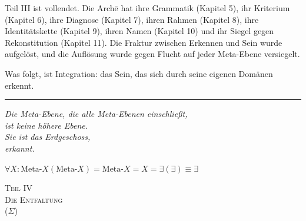 \documentclass[10pt, openany, oneside]{book}
\renewcommand{\normalsize}{\fontsize{10}{13}\selectfont}
\renewcommand{\large}{\fontsize{11.5}{14}\selectfont}
\renewcommand{\LARGE}{\fontsize{15}{18}\selectfont}
\begin{document}
\vspace{2em}

Teil III ist vollendet. Die Arch\={e} hat ihre Grammatik (Kapitel 5), ihr Kriterium (Kapitel 6), ihre Diagnose (Kapitel 7), ihren Rahmen (Kapitel 8), ihre Identitätskette (Kapitel 9), ihren Namen (Kapitel 10) und ihr Siegel gegen Rekonstitution (Kapitel 11). Die Fraktur zwischen Erkennen und Sein wurde aufgelöst, und die Auflösung wurde gegen Flucht auf jeder Meta-Ebene versiegelt.

Was folgt, ist Integration: das Sein, das sich durch seine eigenen Domänen erkennt.

\vspace{2em}

\begin{center}
    \rule{0.15\textwidth}{0.3pt}
\end{center}

\vspace{0.5em}

\begin{center}
    \itshape
    Die Meta-Ebene, die alle Meta-Ebenen einschließt,\\
    ist keine höhere Ebene.\\[0.8em]
    Sie ist das Erdgeschoss,\\
    erkannt.
\end{center}

\vspace{0.5em}

\begin{center}
    $\forall X: \text{Meta-}X(\text{Meta-}X) = \text{Meta-}X = X = \exists(\exists) \equiv \exists$
\end{center}

%
%

\newpage
\thispagestyle{empty}
\vspace*{\fill}
\begin{center}
    {\LARGE\scshape Teil IV}\\[1em]
    {\large\scshape Die Entfaltung}\\[0.5em]
    {\normalsize ($\Sigma$)}
\end{center}
\vspace*{\fill}
\newpage
\end{document}
